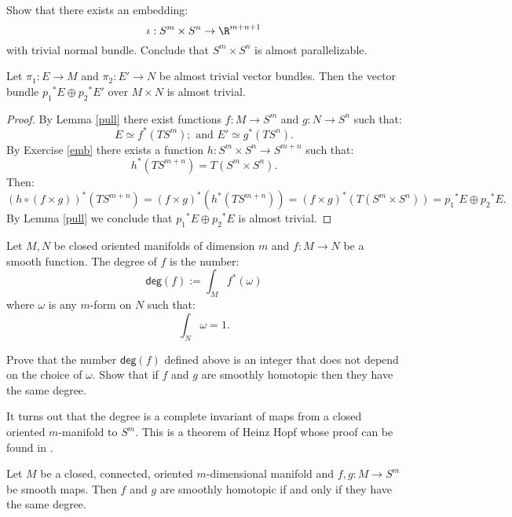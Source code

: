 \begin{exercise}\label{emb}
	Show that there exists an embedding:
	\[ \iota:S^m \times S^n \rightarrow \R^{m+n+1}\]
	with trivial normal bundle. Conclude that $S^m \times S^n$ is almost parallelizable.
\end{exercise}
\begin{lemma}\label{product}
	Let $\pi_1: E \rightarrow M$ and $\pi_2: E' \rightarrow N$ be almost trivial vector bundles. Then the vector bundle ${p_1}^*E \oplus {p_2}^*E'$ over $M \times N$ is almost trivial. \end{lemma}
\begin{proof}
	By Lemma \ref{pull} there exist functions $f: M \rightarrow S^m$ and $g: N \rightarrow S^n$ such that:
	\[ E\simeq f^*(TS^m); \text{ and } E'\simeq g^*(TS^n).\]
	By Exercise \ref{emb} there exists a function $h: S^m \times S^n \rightarrow S^{m+n}$ such that:
	\[ h^*(TS^{m+n})=T(S^m \times S^n).\]
	Then:
	\[ (h \circ (f\times g))^*(TS^{m+n})=(f\times g)^* (h^*(TS^{m+n}))=(f \times g)^*(T(S^m \times S^n))={p_1}^*E \oplus {p_2}^*E.\]
	By Lemma \ref{pull} we conclude that ${p_1}^*E \oplus {p_2}^*E$ is almost trivial.
\end{proof}


\begin{definition}
	Let $M,N$ be closed oriented manifolds of dimension $m$ and $f: M \rightarrow N$ be a smooth function.
	The degree of $f$ is the number:
	\[ \mathsf{deg}(f):= \int_M f^*(\omega)\]
	where $\omega$ is any $m$-form on $N$ such that:
	\[ \int_{N} \omega=1.\]
\end{definition}

\begin{exercise}
	Prove that the number $\mathsf{deg}(f)$ defined above is an integer that does not depend on the choice of $\omega$.
	Show that if $f$ and $g$ are smoothly homotopic then they have the same degree. \end{exercise}

It turns out that the degree is a complete invariant of maps from a closed oriented $m$-manifold to $S^m$. This is a theorem of Heinz Hopf whose proof can be found in \cite{BT}.

\begin{theorem}  Let $M$ be a closed, connected, oriented
	$m$-dimensional manifold and $f,g:M \rightarrow S^m$ be smooth maps.
	Then $f$ and $g$ are smoothly homotopic if and only if they have the same degree.
\end{theorem}


